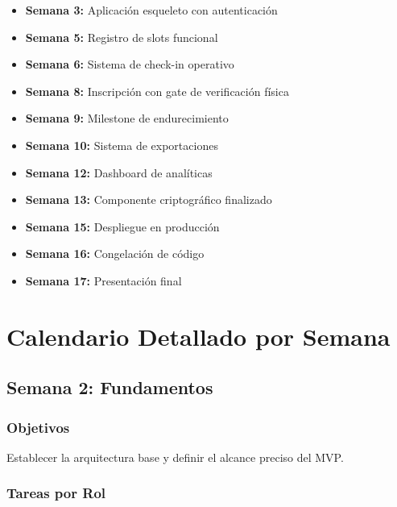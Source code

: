 \documentclass[12pt,a4paper]{article}
\begin{document}
\begin{itemize}[leftmargin=*]
    \item \textbf{Semana 3:} Aplicación esqueleto con autenticación
    \item \textbf{Semana 5:} Registro de slots funcional
    \item \textbf{Semana 6:} Sistema de check-in operativo
    \item \textbf{Semana 8:} Inscripción con gate de verificación física
    \item \textbf{Semana 9:} Milestone de endurecimiento
    \item \textbf{Semana 10:} Sistema de exportaciones
    \item \textbf{Semana 12:} Dashboard de analíticas
    \item \textbf{Semana 13:} Componente criptográfico finalizado
    \item \textbf{Semana 15:} Despliegue en producción
    \item \textbf{Semana 16:} Congelación de código
    \item \textbf{Semana 17:} Presentación final
\end{itemize}

\section{Calendario Detallado por Semana}

\subsection{Semana 2: Fundamentos}

\subsubsection{Objetivos}
Establecer la arquitectura base y definir el alcance preciso del MVP.

\subsubsection{Tareas por Rol}
\end{document}
